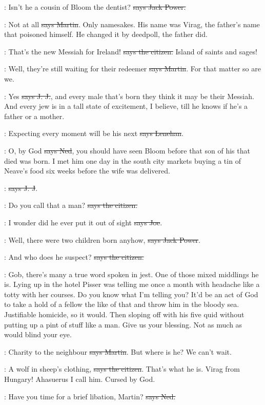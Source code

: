 \power:
Isn't he a cousin of Bloom the dentist?
\sout{says Jack Power.}

\cunningham:
Not at all \sout{says Martin}.
Only namesakes. His name was Virag, the
father's name that poisoned himself. He changed it by deedpoll, the father
did.

\citizen:
That's the new Messiah for Ireland!
\sout{says the citizen.}
Island of saints and sages!

\cunningham:
Well, they're still waiting for their redeemer
\sout{says Martin}. For that
matter so are we.

\jjom:
Yes \sout{says J. J.},
and every male that's born they think it may be their
Messiah. And every jew is in a tall state of excitement, I believe, till
he knows if he's a father or a mother.

\lenehan:
Expecting every moment will be his next
\sout{says Lenehan}.

\lambert:
O, by God \sout{says Ned},
you should have seen Bloom before that son of his
that died was born. I met him one day in the south city markets buying a
tin of Neave's food six weeks before the wife was delivered.

\jjom:
 \sout{says J. J}.

\citizen:
Do you call that a man?
\sout{says the citizen.}

\joe:
I wonder did he ever put it out of sight
\sout{says Joe}.

\power:
Well, there were two children born anyhow,
\sout{says Jack Power}.

\citizen:
And who does he suspect?
\sout{says the citizen.}

\Nq:
Gob, there's many a true word spoken in jest. One of those mixed
middlings he is. Lying up in the hotel Pisser was telling me once a month
with headache like a totty with her courses. Do you know what I'm telling
you? It'd be an act of God to take a hold of a fellow the like of that and
throw him in the bloody sea. Justifiable homicide, so it would. Then
sloping off with his five quid without putting up a pint of stuff like a
man. Give us your blessing. Not as much as would blind your eye.

\cunningham:
Charity to the neighbour \sout{says Martin}.
But where is he? We can't wait.

\citizen:
A wolf in sheep's clothing,
\sout{says the citizen}. That's what he is. Virag
from Hungary! Ahasuerus I call him. Cursed by God.

\lambert:
Have you time for a brief libation,
Martin? \sout{says Ned.}

